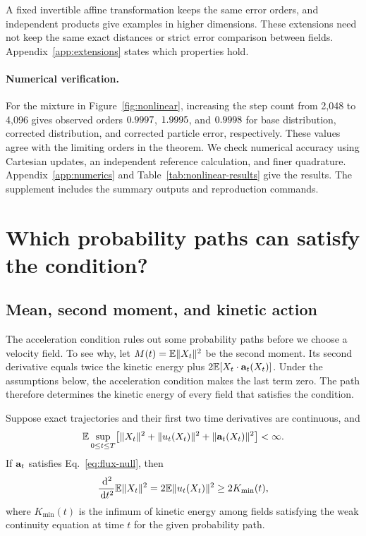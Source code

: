 A fixed invertible affine transformation keeps the same error orders, and independent products give examples in higher dimensions. These extensions need not keep the same exact distances or strict error comparison between fields. Appendix~\ref{app:extensions} states which properties hold.

\paragraph{Numerical verification.}\label{sec:numerics}
For the mixture in Figure~\ref{fig:nonlinear}, increasing the step count from 2,048 to 4,096 gives observed orders $0.9997$, $1.9995$, and $0.9998$ for base distribution, corrected distribution, and corrected particle error, respectively. These values agree with the limiting orders in the theorem. We check numerical accuracy using Cartesian updates, an independent reference calculation, and finer quadrature. Appendix~\ref{app:numerics} and Table~\ref{tab:nonlinear-results} give the results. The supplement includes the summary outputs and reproduction commands.


\FloatBarrier
\section{Which probability paths can satisfy the condition?}
\label{sec:path-restrictions}

\subsection{Mean, second moment, and kinetic action}

The acceleration condition rules out some probability paths before we choose a velocity field. To see why, let $M(t)=\mathbb E\|X_t\|^2$ be the second moment. Its second derivative equals twice the kinetic energy plus $2\mathbb E[X_t\cdot\mathbf a_t(X_t)]$. Under the assumptions below, the acceleration condition makes the last term zero. The path therefore determines the kinetic energy of every field that satisfies the condition.

\begin{proposition}
\label{prop:obstruction}
Suppose exact trajectories and their first two time derivatives are continuous, and
\[
 \mathbb E\sup_{0\le t\le T}
 \bigl[\|X_t\|^2+\|u_t(X_t)\|^2+\|\mathbf a_t(X_t)\|^2\bigr]<\infty.
\]
If $\mathbf a_t$ satisfies Eq.~\eqref{eq:flux-null}, then
\begin{equation}
 \frac{\,\mathrm d^2}{\,\mathrm d t^2}\mathbb E\|X_t\|^2
 =2\mathbb E\|u_t(X_t)\|^2
 \ge 2K_{\min}(t),
 \label{eq:moment-obstruction}
\end{equation}
where $K_{\min}(t)$ is the infimum of kinetic energy among fields satisfying the weak continuity equation at time $t$ for the given probability path.
\end{proposition}

